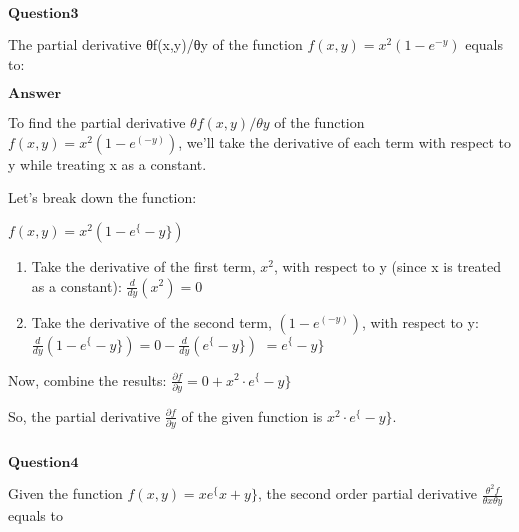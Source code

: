 \documentclass[11pt]{article}
\makeatletter
\newcommand{\boxspacing}{\kern\kvtcb@left@rule\kern\kvtcb@boxsep}
\newcommand{\prompt}[4]{
        {\ttfamily\llap{{\color{#2}[#3]:\hspace{3pt}#4}}\vspace{-\baselineskip}}
    }
\makeatother
\begin{document}
    \begin{tcolorbox}[breakable, size=fbox, boxrule=1pt, pad at break*=1mm,colback=cellbackground, colframe=cellborder]
\prompt{In}{incolor}{ }{\boxspacing}
\begin{Verbatim}[commandchars=\\\{\}]

\end{Verbatim}
\end{tcolorbox}

    $\textbf{Question3}$

The partial derivative θf(x,y)/θy of the function
$f(x,y)=x^2(1-e^{-y})$ equals to:

$\textbf{Answer}$

To find the partial derivative $θf(x, y)/θy$ of the function $f(x, y) = x^2(1 - e^(-y))$, we'll take the derivative of each term with respect to y while treating x as a constant.

Let's break down the function:

$ f(x, y) = x^2(1 - e^\{-y\}) $

\begin{enumerate}
\def\labelenumi{\arabic{enumi}.}
\item
  Take the derivative of the first term, $x^2$, with respect to y
  (since x is treated as a constant): $ \frac{d}{dy} (x^2) = 0 $
\item
  Take the derivative of the second term, $(1 - e^(-y))$, with respect
  to y: $ \frac{d}{dy} (1 - e^\{-y\}) = 0 - \frac{d}{dy} (e^\{-y\}) $ $ = e^\{-y\} $
\end{enumerate}

Now, combine the results: $ \frac{\partial f}{\partial y} = 0 + x^2
\cdot e^\{-y\} $

So, the partial derivative $ \frac{\partial f}{\partial y} $ of the
given function is $ x^2 \cdot e^\{-y\} $.

    \begin{tcolorbox}[breakable, size=fbox, boxrule=1pt, pad at break*=1mm,colback=cellbackground, colframe=cellborder]
\prompt{In}{incolor}{ }{\boxspacing}
\begin{Verbatim}[commandchars=\\\{\}]

\end{Verbatim}
\end{tcolorbox}

    $\textbf{Question4}$

Given the function $ f(x,y)=xe^\{x+y\} $, the second order partial
derivative $\frac{θ^2f}{θxθy}$ equals to
\end{document}

